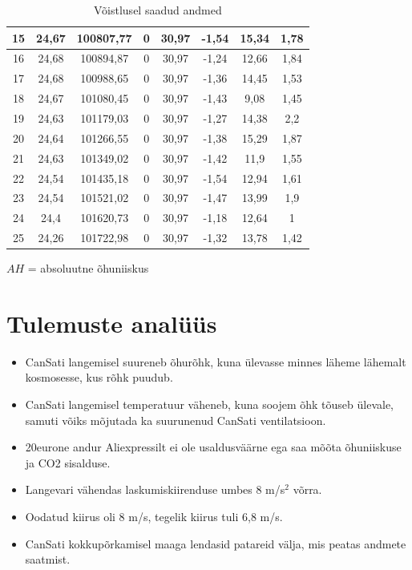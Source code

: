 \begin{table}[H]
\begin{tabular}{|c|c|c|c|c|c|c|c|}
        15 & 24,67 & 100807,77 & 0 & 30,97 & -1,54 & 15,34 & 1,78 \\ \hline
        16 & 24,68 & 100894,87 & 0 & 30,97 & -1,24 & 12,66 & 1,84 \\ \hline
        17 & 24,68 & 100988,65 & 0 & 30,97 & -1,36 & 14,45 & 1,53 \\ \hline
        18 & 24,67 & 101080,45 & 0 & 30,97 & -1,43 & 9,08 & 1,45 \\ \hline
        19 & 24,63 & 101179,03 & 0 & 30,97 & -1,27 & 14,38 & 2,2 \\ \hline
        20 & 24,64 & 101266,55 & 0 & 30,97 & -1,38 & 15,29 & 1,87 \\ \hline
        21 & 24,63 & 101349,02 & 0 & 30,97 & -1,42 & 11,9 & 1,55 \\ \hline
        22 & 24,54 & 101435,18 & 0 & 30,97 & -1,54 & 12,94 & 1,61 \\ \hline
        23 & 24,54 & 101521,02 & 0 & 30,97 & -1,47 & 13,99 & 1,9 \\ \hline
        24 & 24,4 & 101620,73 & 0 & 30,97 & -1,18 & 12,64 & 1 \\ \hline
        25 & 24,26 & 101722,98 & 0 & 30,97 & -1,32 & 13,78 & 1,42 \\ \hline
    \end{tabular}
    \caption{Võistlusel saadud andmed}
    \label{tab:6}
\end{table}

$AH$ = absoluutne õhuniiskus

\section{Tulemuste analüüs}

\begin{itemize}
    \item CanSati langemisel suureneb õhurõhk, kuna ülevasse minnes läheme lähemalt kosmosesse, kus rõhk puudub.
    \item CanSati langemisel temperatuur väheneb, kuna soojem õhk tõuseb ülevale, samuti võiks mõjutada ka suurunenud CanSati ventilatsioon.
    \item 20eurone andur Aliexpressilt ei ole usaldusväärne ega saa mõõta õhuniiskuse ja CO2 sisalduse.
    \item Langevari vähendas laskumiskiirenduse umbes 8 m/s$^2$ võrra.
    \item Oodatud kiirus oli 8 m/s, tegelik kiirus tuli 6,8 m/s.
    \item CanSati kokkupõrkamisel maaga lendasid patareid välja, mis peatas andmete saatmist.

\end{itemize}

